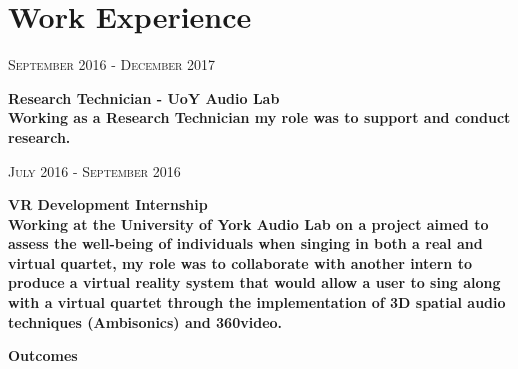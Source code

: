 \documentclass[10pt]{article}
\begin{document}
\begin{minipage}[t]{0.74\textwidth}

    \section{Work Experience}

    \begin{center}
        {\textsc{September 2016 - December 2017}}\\
    \end{center}

        \bf{Research Technician - UoY Audio Lab} \\
            Working as a Research Technician my role was to support and conduct research.

            



            
    
	\begin{center}
    	{\textsc{July 2016 - September 2016}}\\
    \end{center}

    \hspace{-6mm}
    \begin{minipage}[t]{0.65\textwidth}
    	\bf{VR Development Internship} \\

    	\normalfont Working at the University of York Audio Lab on a project aimed to assess the well-being of individuals when singing in both a real and virtual quartet, my role was to collaborate with another intern to produce a virtual reality system that would allow a user to sing along with a virtual quartet through the implementation of 3D spatial audio techniques (Ambisonics) and 360\degree video.
    \end{minipage} \hfill
    \begin{minipage}[t]{0.3\textwidth}
	    \bf{Outcomes}\normalfont \\
	    

\end{minipage}
\end{minipage}
\end{document}
